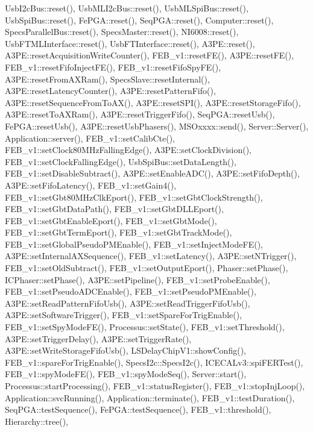 Usb\+I2c\+Bus\+::reset(), Usb\+M\+L\+I2c\+Bus\+::reset(), Usb\+M\+L\+Spi\+Bus\+::reset(), Usb\+Spi\+Bus\+::reset(), Fe\+P\+G\+A\+::reset(), Seq\+P\+G\+A\+::reset(), Computer\+::reset(), Specs\+Parallel\+Bus\+::reset(), Specs\+Master\+::reset(), N\+I6008\+::reset(), Usb\+F\+T\+M\+L\+Interface\+::reset(), Usb\+F\+T\+Interface\+::reset(), A3\+P\+E\+::reset(), A3\+P\+E\+::reset\+Acquisition\+Write\+Counter(), F\+E\+B\+\_\+v1\+::reset\+F\+E(), A3\+P\+E\+::reset\+F\+E(), F\+E\+B\+\_\+v1\+::reset\+Fifo\+Inject\+F\+E(), F\+E\+B\+\_\+v1\+::reset\+Fifo\+Spy\+F\+E(), A3\+P\+E\+::reset\+From\+A\+X\+Ram(), Specs\+Slave\+::reset\+Internal(), A3\+P\+E\+::reset\+Latency\+Counter(), A3\+P\+E\+::reset\+Pattern\+Fifo(), A3\+P\+E\+::reset\+Sequence\+From\+To\+A\+X(), A3\+P\+E\+::reset\+S\+P\+I(), A3\+P\+E\+::reset\+Storage\+Fifo(), A3\+P\+E\+::reset\+To\+A\+X\+Ram(), A3\+P\+E\+::reset\+Trigger\+Fifo(), Seq\+P\+G\+A\+::reset\+Usb(), Fe\+P\+G\+A\+::reset\+Usb(), A3\+P\+E\+::reset\+Usb\+Phasers(), M\+S\+Oxxxx\+::send(), Server\+::\+Server(), Application\+::server(), F\+E\+B\+\_\+v1\+::set\+Calib\+Cte(), F\+E\+B\+\_\+v1\+::set\+Clock80\+M\+Hz\+Falling\+Edge(), A3\+P\+E\+::set\+Clock\+Division(), F\+E\+B\+\_\+v1\+::set\+Clock\+Falling\+Edge(), Usb\+Spi\+Bus\+::set\+Data\+Length(), F\+E\+B\+\_\+v1\+::set\+Disable\+Subtract(), A3\+P\+E\+::set\+Enable\+A\+D\+C(), A3\+P\+E\+::set\+Fifo\+Depth(), A3\+P\+E\+::set\+Fifo\+Latency(), F\+E\+B\+\_\+v1\+::set\+Gain4(), F\+E\+B\+\_\+v1\+::set\+Gbt80\+M\+Hz\+Clk\+Eport(), F\+E\+B\+\_\+v1\+::set\+Gbt\+Clock\+Strength(), F\+E\+B\+\_\+v1\+::set\+Gbt\+Data\+Path(), F\+E\+B\+\_\+v1\+::set\+Gbt\+D\+L\+L\+Eport(), F\+E\+B\+\_\+v1\+::set\+Gbt\+Enable\+Eport(), F\+E\+B\+\_\+v1\+::set\+Gbt\+Mode(), F\+E\+B\+\_\+v1\+::set\+Gbt\+Term\+Eport(), F\+E\+B\+\_\+v1\+::set\+Gbt\+Track\+Mode(), F\+E\+B\+\_\+v1\+::set\+Global\+Pseudo\+P\+M\+Enable(), F\+E\+B\+\_\+v1\+::set\+Inject\+Mode\+F\+E(), A3\+P\+E\+::set\+Internal\+A\+X\+Sequence(), F\+E\+B\+\_\+v1\+::set\+Latency(), A3\+P\+E\+::set\+N\+Trigger(), F\+E\+B\+\_\+v1\+::set\+Old\+Subtract(), F\+E\+B\+\_\+v1\+::set\+Output\+Eport(), Phaser\+::set\+Phase(), I\+C\+Phaser\+::set\+Phase(), A3\+P\+E\+::set\+Pipeline(), F\+E\+B\+\_\+v1\+::set\+Probe\+Enable(), F\+E\+B\+\_\+v1\+::set\+Pseudo\+A\+D\+C\+Enable(), F\+E\+B\+\_\+v1\+::set\+Pseudo\+P\+M\+Enable(), A3\+P\+E\+::set\+Read\+Pattern\+Fifo\+Usb(), A3\+P\+E\+::set\+Read\+Trigger\+Fifo\+Usb(), A3\+P\+E\+::set\+Software\+Trigger(), F\+E\+B\+\_\+v1\+::set\+Spare\+For\+Trig\+Enable(), F\+E\+B\+\_\+v1\+::set\+Spy\+Mode\+F\+E(), Processus\+::set\+State(), F\+E\+B\+\_\+v1\+::set\+Threshold(), A3\+P\+E\+::set\+Trigger\+Delay(), A3\+P\+E\+::set\+Trigger\+Rate(), A3\+P\+E\+::set\+Write\+Storage\+Fifo\+Usb(), L\+S\+Delay\+Chip\+V1\+::show\+Config(), F\+E\+B\+\_\+v1\+::spare\+For\+Trig\+Enable(), Specs\+I2c\+::\+Specs\+I2c(), I\+C\+E\+C\+A\+Lv3\+::spi\+F\+E\+R\+Test(), F\+E\+B\+\_\+v1\+::spy\+Mode\+F\+E(), F\+E\+B\+\_\+v1\+::spy\+Mode\+Seq(), Server\+::start(), Processus\+::start\+Processing(), F\+E\+B\+\_\+v1\+::status\+Register(), F\+E\+B\+\_\+v1\+::stop\+Inj\+Loop(), Application\+::svc\+Running(), Application\+::terminate(), F\+E\+B\+\_\+v1\+::test\+Duration(), Seq\+P\+G\+A\+::test\+Sequence(), Fe\+P\+G\+A\+::test\+Sequence(), F\+E\+B\+\_\+v1\+::threshold(), Hierarchy\+::tree(), 